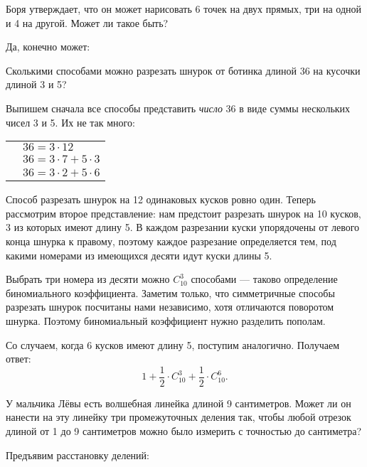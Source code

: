 
\begin{itemize}

	\itA Боря утверждает, что он может нарисовать 6 точек на двух прямых, три на одной и 4 на другой. Может ли такое быть?
	
	\itr Да, конечно может:
	
	\begin{center}  \end{center}
	
	\def\cm#1{\SI{#1}{\text{см}}}
	\itB Сколькими способами можно разрезать шнурок от ботинка длиной \cm{36} на кусочки длиной \cm{3} и \cm{5}?
	
	\itr Выпишем сначала все способы представить {\itshape число} 36 в виде суммы нескольких чисел 3 и 5. Их не так много:
	
	\begin{tabular}{ll}
	\qquad & $36 = 3 \cdot 12$ \\
		& $36 = 3 \cdot 7 + 5 \cdot 3$ \\
		& $36 = 3 \cdot 2 + 5 \cdot 6$
	\end{tabular}
	
	Способ разрезать шнурок на 12 одинаковых кусков ровно один. Теперь рассмотрим второе представление: нам предстоит разрезать шнурок на 10 кусков, 3 из которых имеют длину 5. В каждом разрезании куски упорядочены от левого конца шнурка к правому, поэтому каждое разрезание определяется тем, под какими номерами из имеющихся десяти идут куски длины 5.
	
	Выбрать три номера из десяти можно $C_{10}^3$ способами — таково определение биномиального коэффициента. Заметим только, что симметричные способы разрезать шнурок посчитаны нами независимо, хотя отличаются поворотом шнурка. Поэтому биномиальный коэффициент нужно разделить пополам.
	
	Со случаем, когда 6 кусков имеют длину 5, поступим аналогично. Получаем ответ:
	$$1 + \frac{1}{2} \cdot C_{10}^3 + \frac{1}{2} \cdot C_{10}^6.$$
	
	\itC У мальчика Лёвы есть волшебная линейка длиной 9 сантиметров. Может ли он нанести на эту линейку три промежуточных деления так, чтобы любой отрезок длиной от 1 до 9 сантиметров можно было измерить с точностью до сантиметра?
	
	\itr Предъявим расстановку делений:

	

\end{itemize}

